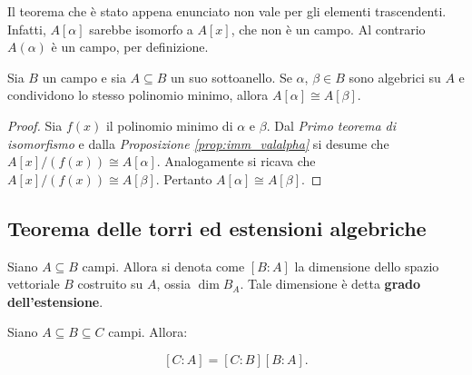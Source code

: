 \begin{remark*}
    Il teorema che è stato appena enunciato non vale per
    gli elementi trascendenti. Infatti, $A[\alpha]$ sarebbe
    isomorfo a $A[x]$, che non è un campo. Al contrario
    $A(\alpha)$ è un campo, per definizione.
\end{remark*}

\begin{proposition}
    Sia $B$ un campo e sia $A \subseteq B$ un suo sottoanello.
    Se $\alpha$, $\beta \in B$ sono algebrici su $A$ e condividono
    lo stesso polinomio minimo, allora $A[\alpha] \cong A[\beta]$.
\end{proposition}

\begin{proof}
    Sia $f(x)$ il polinomio minimo di $\alpha$ e $\beta$.
    Dal \textit{Primo teorema di isomorfismo} e dalla
    \textit{Proposizione \ref{prop:imm_valalpha}} si
    desume che $A[x]/(f(x)) \cong A[\alpha]$. Analogamente
    si ricava che $A[x]/(f(x)) \cong A[\beta]$. Pertanto
    $A[\alpha] \cong A[\beta]$.
\end{proof}

\subsection{Teorema delle torri ed estensioni algebriche}

\begin{definition}
    Siano $A \subseteq B$ campi. Allora si denota come
    $[B : A]$ la dimensione dello spazio vettoriale $B$
    costruito su $A$, ossia $\dim B_A$. Tale dimensione è detta \textbf{grado
        dell'estensione}.
\end{definition}

\begin{theorem}
    \label{th:torri}
    Siano $A \subseteq B \subseteq C$ campi. Allora:

    \[ [C : A] = [C : B] [B : A]. \]
    \vskip 0.1in
\end{theorem}

